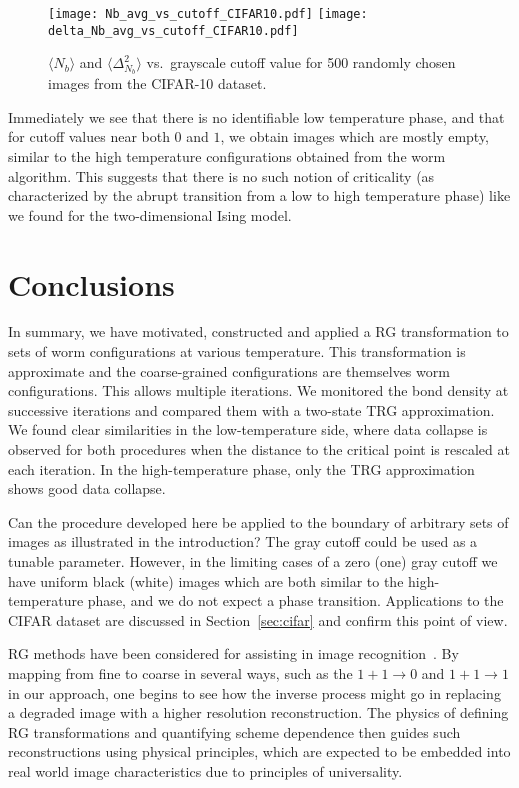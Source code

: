 \documentclass[../main.tex]{subfiles}
\begin{document}
%
\begin{figure*}[htpb]
    \centering
    \texttt{[image: Nb\_avg\_vs\_cutoff\_CIFAR10.pdf]}
    \texttt{[image: delta\_Nb\_avg\_vs\_cutoff\_CIFAR10.pdf]}
    \caption{$\langle N_b\rangle$ and $\langle \Delta_{N_b}^2\rangle$ vs.\
    grayscale cutoff value for 500 randomly chosen images from the CIFAR-10
  dataset.}%
\label{fig:CIFAR10_bond_stats}
\end{figure*}
%
Immediately we see that there is no identifiable low temperature phase, and
that for cutoff values near both $0$ and $1$, we obtain images which are mostly
empty, similar to the high temperature configurations obtained from the worm
algorithm.
%
This suggests that there is no such notion of criticality (as characterized by
the abrupt transition from a low to high temperature phase) like we found for
the two-dimensional Ising model.

\section{Conclusions}
In summary, we have motivated, constructed and applied a
RG transformation to sets of worm configurations at various temperature.
%
This transformation is approximate and the coarse-grained configurations are
themselves worm configurations.
%
This allows multiple iterations.
%
We monitored the bond density at successive iterations and compared them with a
two-state TRG approximation.
%
We found clear similarities in the low-temperature side, where data collapse is
observed for both procedures when the distance to the critical point is
rescaled at each iteration.
%
In the high-temperature phase, only the TRG approximation shows good data
collapse. 

Can the procedure developed here be applied to the boundary of arbitrary sets
of images as illustrated in the introduction?
%
The gray cutoff could be used as a tunable parameter.
%
However, in the limiting cases of a zero (one) gray cutoff we have uniform
black (white) images which are both similar to the high-temperature phase, and
we do not expect a phase transition.
%
Applications to the CIFAR dataset are discussed in Section~\ref{sec:cifar} and
confirm this point of view. 

RG methods have been considered for assisting in image recognition~\cite{16712,
0305-4470-35-37-201,1997PhLA..227..319H}.
%
By mapping from fine to coarse in several ways, such as the $1 + 1\rightarrow
0$ and $1 + 1\rightarrow 1$ in our approach, one begins to see how the inverse
process might go in replacing a degraded image with a higher resolution
reconstruction.
%
The physics of defining RG transformations and quantifying scheme dependence
then guides such reconstructions using physical principles, which are expected
to be embedded into real world image characteristics due to principles of
universality.
\end{document}
